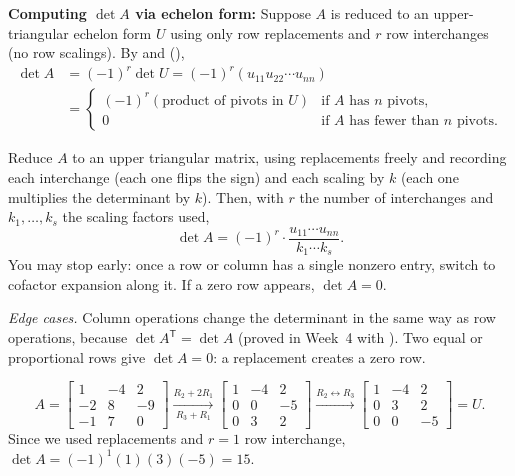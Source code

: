 \documentclass[10pt]{scrartcl}
\begin{document}
\begin{itemize}
  \ii \textbf{Computing $\det A$ via echelon form:} Suppose $A$ is reduced to an upper-triangular echelon form $U$ using only row replacements and $r$ row interchanges (no row scalings). By  and (),
  \[
    \begin{aligned}\det A &= (-1)^r \det U = (-1)^r (u_{11}u_{22}\cdots u_{nn})\\ &= \begin{cases} (-1)^r (\text{product of pivots in }U) & \text{if }A\text{ has }n\text{ pivots}, \\ 0 & \text{if }A\text{ has fewer than }n\text{ pivots}. \end{cases}\end{aligned}
  \]
\end{itemize}

\begin{steps}
  \ii Reduce $A$ to an upper triangular matrix, using replacements freely and recording each interchange (each one flips the sign) and each scaling by $k$ (each one multiplies the determinant by $k$).
  \ii Then, with $r$ the number of interchanges and $k_1,\dots,k_s$ the scaling factors used,
  \[
    \det A=(-1)^{r}\cdot\frac{u_{11}\cdots u_{nn}}{k_1\cdots k_s}.
  \]
  \ii You may stop early: once a row or column has a single nonzero entry, switch to cofactor expansion along it. If a zero row appears, $\det A=0$.
\end{steps}
\emph{Edge cases.} Column operations change the determinant in the same way as row operations, because $\det A^{\mathsf T}=\det A$ (proved in Week~4 with ). Two equal or proportional rows give $\det A=0$: a replacement creates a zero row.

\begin{example*}
\[
    A = \begin{bmatrix} 1 & -4 & 2 \\ -2 & 8 & -9 \\ -1 & 7 & 0 \end{bmatrix}
    \xrightarrow[R_3+R_1]{R_2+2R_1}
    \begin{bmatrix} 1 & -4 & 2 \\ 0 & 0 & -5 \\ 0 & 3 & 2 \end{bmatrix}
    \xrightarrow{R_2\leftrightarrow R_3}
    \begin{bmatrix} 1 & -4 & 2 \\ 0 & 3 & 2 \\ 0 & 0 & -5 \end{bmatrix} = U.
  \]
  Since we used replacements and $r=1$ row interchange, $\det A=(-1)^1(1)(3)(-5)=15$.
\end{example*}
\end{document}
